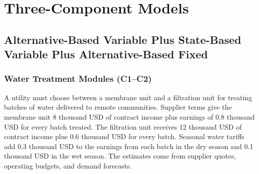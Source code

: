 	
	\section{Three-Component Models}
	\label{sec:three-component-models}


\subsection{Alternative-Based Variable Plus State-Based Variable Plus Alternative-Based Fixed}
	\label{sec:alternative-based-variable-payoff-plus-state-based-variable-payoff-plus-alternative-based-fixed-payoff}



	\subsubsection{Water Treatment Modules (C1--C2)}
	\label{sec:problem26-water-treatment-modules-c1-c2}
	
	A utility must choose between a membrane unit and a filtration unit for treating batches of water delivered to remote communities. Supplier terms give the membrane unit 8 thousand USD of contract income plus earnings of 0.8 thousand USD for every batch treated. The filtration unit receives 12 thousand USD of contract income plus 0.6 thousand USD for every batch. Seasonal water tariffs add 0.3 thousand USD to the earnings from each batch in the dry season and 0.1 thousand USD in the wet season. The estimates come from supplier quotes, operating budgets, and demand forecasts.
	

